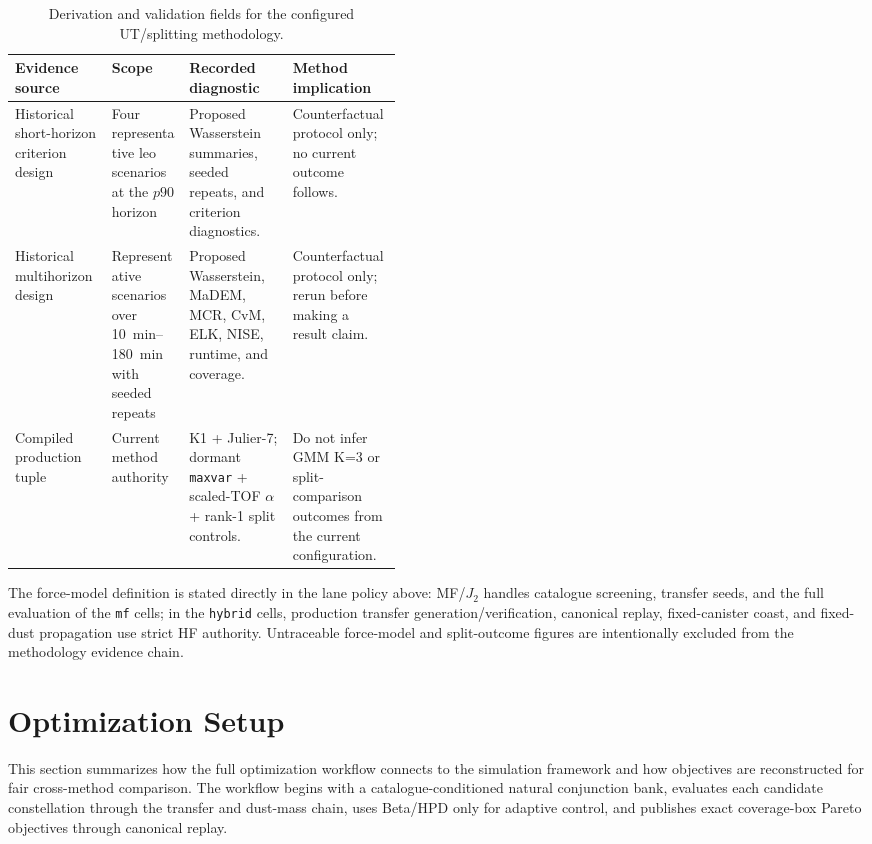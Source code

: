     \begin{table}[htb]
        \centering
        \caption[UT/splitting derivation and validation protocol]{Derivation and validation fields for the configured UT/splitting methodology.}
        \label{tab:dust_split_evidence_summary}
        \begin{tabularx}{0.96\linewidth}{@{}L{0.25\linewidth}L{0.20\linewidth}Y Y@{}}
            \toprule
            Evidence source & Scope & Recorded diagnostic & Method implication \\
            \midrule
            Historical short-horizon criterion design & Four representative \gls{leo} scenarios at the \(p90\) horizon & Proposed Wasserstein summaries, seeded repeats, and criterion diagnostics. & Counterfactual protocol only; no current outcome follows. \\
            Historical multihorizon design & Representative scenarios over \SIrange{10}{180}{\minute} with seeded repeats & Proposed Wasserstein, MaDEM, MCR, CvM, ELK, NISE, runtime, and coverage. & Counterfactual protocol only; rerun before making a result claim. \\
            Compiled production tuple & Current method authority & K1 + Julier-7; dormant \texttt{maxvar} + scaled-TOF \(\alpha\) + rank-1 split controls. & Do not infer GMM K=3 or split-comparison outcomes from the current configuration. \\
            \bottomrule
        \end{tabularx}
    \end{table}

    The force-model definition is stated directly in the lane policy above: MF/\(J_2\) handles catalogue screening, transfer seeds, and the full evaluation of the \texttt{mf} cells; in the \texttt{hybrid} cells, production transfer generation/verification, canonical replay, fixed-canister coast, and fixed-dust propagation use strict HF authority. Untraceable force-model and split-outcome figures are intentionally excluded from the methodology evidence chain.

    \clearpage
\section{Optimization Setup} \label{se:optsetup}
    This section summarizes how the full optimization workflow connects to the simulation framework and how objectives are reconstructed for fair cross-method comparison. The workflow begins with a catalogue-conditioned natural conjunction bank, evaluates each candidate constellation through the transfer and dust-mass chain, uses Beta/HPD only for adaptive control, and publishes exact coverage-box Pareto objectives through canonical replay.

